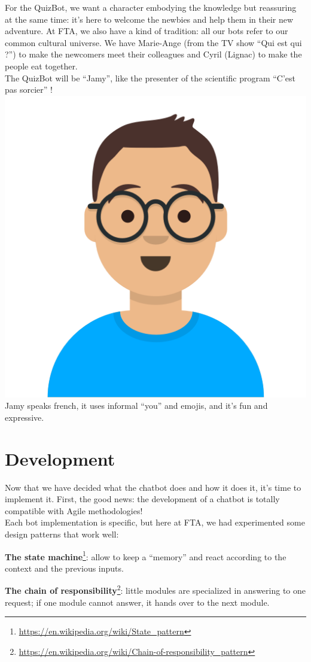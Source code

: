 \documentclass{article}
\begin{document}
\break
For the QuizBot, we want a character embodying the knowledge but reassuring at the same time: it’s here to welcome the newbies and help them in their new adventure. At FTA, we also have a kind of tradition: all our bots refer to our common cultural universe. We have Marie-Ange (from the TV show “Qui est qui ?”) to make the newcomers meet their colleagues and Cyril (Lignac) to make the people eat together.\\
The QuizBot will be “Jamy”, like the presenter of the scientific program “C’est pas sorcier” !\\
\includegraphics[scale=0.5]{images/jamy_avatar.png}
\newline
\newline
Jamy speaks french, it uses informal “you” and emojis, and it's fun and expressive.

\newpage
\section{Development}
Now that we have decided what the chatbot does and how it does it, it’s time to implement it. First, the good news: the development of a chatbot is totally compatible with Agile methodologies!\\
Each bot implementation is specific, but here at FTA, we had experimented some design patterns that work well:
\begin{description}
\item \textbf{The state machine}\footnote{\url{https://en.wikipedia.org/wiki/State_pattern}}: allow to keep a “memory” and react according to the context and the previous inputs.
\item \textbf{The chain of responsibility}\footnote{\url{https://en.wikipedia.org/wiki/Chain-of-responsibility_pattern}}: little modules are specialized in answering to one request; if one module cannot answer, it hands over to the next module.
\end{description}
\end{document}
